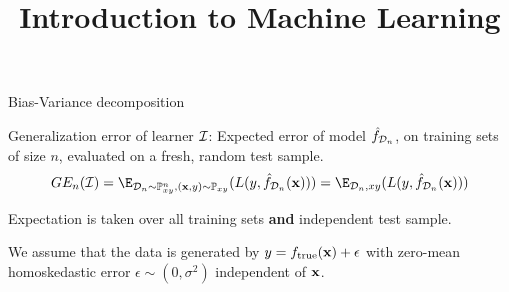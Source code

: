\documentclass[11pt,compress,t,notes=noshow, xcolor=table]{beamer}
\title{Introduction to Machine Learning}
\begin{document}
    

\begin{framei}[sep=L]{Bias-Variance decomposition}

\item Generalization error of learner  $\mathcal{I}$: 
Expected error of model $\hat{f}_{\mathcal{D}_n}$, on training sets of size $n$, evaluated on a fresh, random test sample.
$$GE_n(\ind) = \E_{\D_n \sim \Pxy^n, (\xv, y) \sim \Pxy}( L(y, \fh_{\D_n}(\xv)) ) = \E_{\D_n, xy}( L(y, \fh_{\D_n}(\xv)) )  $$

\item Expectation is taken over all training sets \textbf{and} independent test sample.\\

\item We assume that the data is generated by 
$
y = f_{\text{true}}(\mathbf{x}) + \epsilon
$
with zero-mean homoskedastic error $\epsilon \sim (0, \sigma^2)$ independent of $\mathbf{x}$.  

\end{framei}
\end{document}
